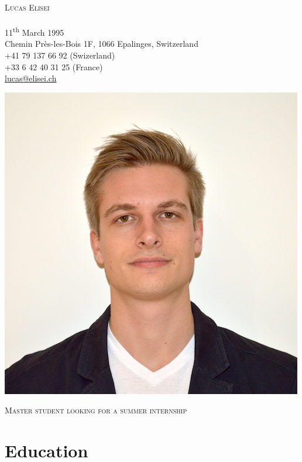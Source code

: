 \documentclass[a4paper,10pt]{article}
\begin{document}
\begin{minipage}{0.6\textwidth}
    {\huge \textsc{Lucas Elisei}} \\
    \\
    11\textsuperscript{th} March 1995 \\
    Chemin Près-les-Bois 1F, 1066 Epalinges, Switzerland \\
    +41 79 137 66 92 (Swizerland) \\
    +33 6 42 40 31 25 (France) \\
    \href{mailto:lucas@elisei.ch}{lucas@elisei.ch}
\end{minipage} %
\begin{minipage}{0.4\textwidth}
    \begin{flushright}
        \includegraphics[width=0.6\linewidth]{photo.jpg}
    \end{flushright}
\end{minipage}

\vspace*{0.5cm}

\begin{framed}
    \centering
    \large{\textsc{
        Master student looking for a summer internship
    }}
\end{framed}

\section{Education}
\end{document}
